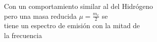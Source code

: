\documentclass[preview]{standalone}
\begin{document}
\begin{center}
\begin{justify}
                      Con un comportamiento similar al del Hidrógeno\\
                      pero una masa reducida $\mu = \frac{m_e}{2}$ se \\
                      tiene un espectro de emisión con la mitad de \\
                      la frecuencia
                      \end{justify}
\end{center}
\end{document}
